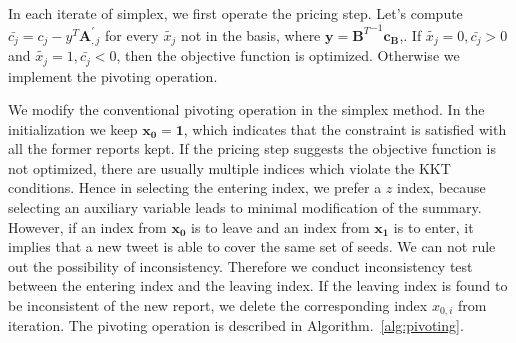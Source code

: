 \documentclass{llncs}
\begin{document}
In each iterate of simplex, we first operate the pricing step.  Let's compute $\bar{c_j} = c_j - y^T\mathbf{A}_{,j}^{'}$ for every $\tilde{x_j}$ not in the basis, where $\mathbf{y} = {\mathbf{B}^T}^{-1}\mathbf{c_B}$,. If $\tilde{x_j }= 0, \bar{c_j} > 0$ and $\tilde{x_j} = 1,\bar{c_j} < 0$, then the objective function is optimized. Otherwise we implement the pivoting operation.


We modify the conventional pivoting operation in the simplex method. In the initialization we keep $\mathbf{x_0}=\mathbf{1}$, which indicates that the constraint is satisfied with all the former reports kept. If the pricing step suggests the objective function is not optimized, there are usually multiple indices which violate the KKT conditions.  Hence in selecting the entering index, we prefer a $z$ index, because selecting an auxiliary variable leads to minimal modification of the summary. However, if an index from $\mathbf{x_0}$ is to leave and an index from $\mathbf{x_1}$ is to enter, it implies that a new tweet is able to cover the same set of seeds. We can not rule out the possibility of inconsistency. Therefore we conduct inconsistency test between the entering index and the leaving index. If the leaving index is found to be inconsistent of the new report, we delete the corresponding index $x_{0,i}$ from iteration. The pivoting operation is described in Algorithm.~\ref{alg:pivoting}.

%
\end{document}
